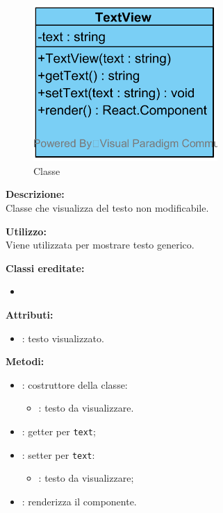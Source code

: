 \paragraph[::TextView]{\class}\mbox{}\\ \label{\class}
\begin{figure}[H]
	\centering
	\includegraphics[width=7cm]{./diagrammi/framework/view/gui/textview.png}
	\caption{Classe \class}
\end{figure}
\textbf{Descrizione:}\\
Classe che visualizza del testo non modificabile.

\textbf{Utilizzo:}\\
Viene utilizzata per mostrare testo generico.

\textbf{Classi ereditate:}
\begin{itemize}
	\item {}
\end{itemize}


\textbf{Attributi:}
\begin{itemize}
	\item {}: testo visualizzato.
\end{itemize}

\textbf{Metodi:}
\begin{itemize}
	\item {}: costruttore della classe:
	\begin{itemize}
		\item {}: testo da visualizzare.
	\end{itemize}
	\item {}: getter per \texttt{text};
	\item {}: setter per \texttt{text}:
	\begin{itemize}
		\item {}: testo da visualizzare;
	\end{itemize}
	\item {}: renderizza il componente.
\end{itemize}
